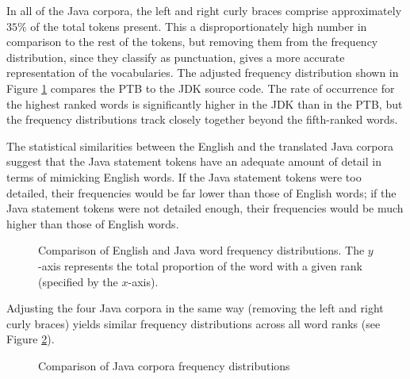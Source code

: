\documentclass{article}
\begin{document}
In all of the Java corpora, the left and right curly braces comprise
approximately $35\%$
of the total tokens present. This a disproportionately high number in
comparison to the rest of the tokens, but removing them from the frequency
distribution, since they classify as punctuation, gives a more accurate
representation of the vocabularies. The adjusted frequency distribution
shown in Figure \ref{english-frequency} compares the PTB to the
JDK source code. The rate of occurrence for the highest
ranked words is significantly higher in the JDK than in the PTB, but
the frequency distributions track closely together beyond the fifth-ranked
words.

The statistical similarities between the English and the translated Java
corpora suggest that the Java statement tokens have an adequate amount of
detail in terms of mimicking English words. If the Java statement tokens
were too detailed, their frequencies would be far lower than those of English
words; if the Java statement tokens were not detailed enough, their
frequencies would be much higher than those of English words.

\begin{figure}
\caption{Comparison of English and Java word frequency distributions.
    The $y$-axis represents the total proportion of the word with a given
    rank (specified by the $x$-axis).}
\label{english-frequency}
\end{figure}
 
Adjusting the four Java corpora in the same way (removing the left and right
curly braces) yields similar frequency distributions across all word ranks
(see Figure \ref{java-frequency}).
 
\begin{figure}
\caption{Comparison of Java corpora frequency distributions}
\label{java-frequency}
\end{figure}
\end{document}
